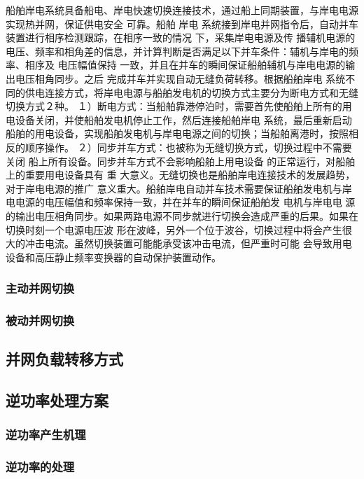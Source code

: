 \cite{SP10}船舶岸电系统具备船电、岸电快速切换连接技术，通过船上同期装置，与岸电电源实现热并网，保证供电安全
可靠。船舶 岸电 系统接到岸电并网指令后，自动并车装置进行相序检测跟踪，在相序一致的情况 下，采集岸电电源及传
播辅机电源的电压、频率和相角差的信息，并计算判断是否满足以下并车条件：辅机与岸电的频率、相序及 电压幅值保持
一致，并且在并车的瞬间保证船舶辅机与岸电电源的输出电压相角同步。之后 完成并车并实现自动无缝负荷转移。根据船舶岸电
系统不同的供电连接方式，将岸电电源与船舶发电机的切换方式主要分为断电方式和无缝切换方式２种。
１）断电方式：当船舶靠港停泊时，需要首先使船舶上所有的用电设备关闭，并使船舶发电机停止工作，然后连接船舶岸电
系统，最后重新启动船舶的用电设备，实现船舶发电机与岸电电源之间的切换；当船舶离港时，按照相反的顺序操作。
２）同步并车方式：也被称为无缝切换方式，切换过程中不需要关闭 船上所有设备。同步并车方式不会影响船舶上用电设备
的正常运行，对船舶上的重要用电设备具有 重 大意义。无缝切换也是船舶岸电连接技术的发展趋势，对于岸电电源的推广
意义重大。船舶岸电自动并车技术需要保证船舶发电机与岸电电源的电压幅值和频率保持一致，并在并车的瞬间保证船舶发
电机与岸电电 源的输出电压相角同步。如果两路电源不同步就进行切换会造成严重的后果。如果在切换时刻一个电源电压波
形在波峰，另外一个位于波谷，切换过程中将会产生很大的冲击电流。虽然切换装置可能能承受该冲击电流，但严重时可能
会导致用电设备和高压静止频率变换器的自动保护装置动作。



\subsubsection{主动并网切换}
\subsubsection{被动并网切换}

\subsection{并网负载转移方式}
\subsection{逆功率处理方案}
\subsubsection{逆功率产生机理}
\subsubsection{逆功率的处理}
